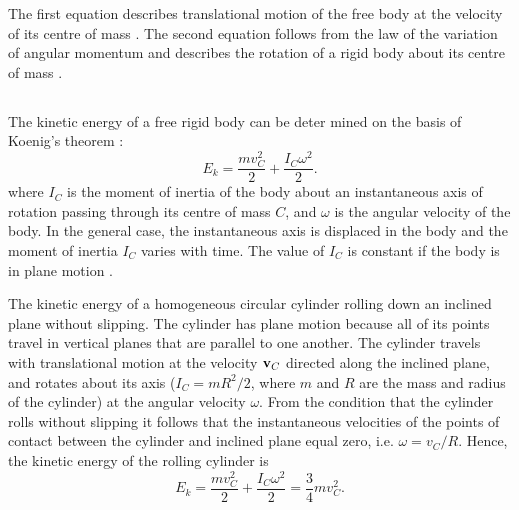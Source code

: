 The first equation describes translational motion of the free body at the velocity of its centre of mass . The second equation follows from the law of the variation of angular momentum  and describes the rotation of a rigid body about its centre of mass .

\subsection{}\label{4.3.7} The kinetic energy of a free rigid body can be deter­ mined on the basis of Koenig's theorem :
\begin{equation*}%
E_{k} = \frac{mv_{C}^{2}}{2} + \frac{I_{C}\omega^{2}}{2}.
\end{equation*}
where $I_{C}$ is the moment of inertia of the body about an instan­taneous axis of rotation passing through its centre of mass $C$, and $\omega$ is the angular velocity of the body. In the general case, the instantaneous axis is displaced in the body and the moment of inertia $I_{C}$ varies with time. The value of $I_{C}$ is constant if the body is in plane motion .

 The kinetic energy of a homogeneous circular cylinder rolling down an inclined plane without slipping. The cylinder has plane motion because all of its points travel in vertical planes that are parallel to one another. The cylinder travels with translational motion at the velocity $\vb{v}_{C}$ directed along the inclined plane, and rotates about its axis ($I_{C} = mR^{2}/2$, where $m$ and $R$ are the mass and radius of the cylinder) at the angular velocity $\omega$. From the condition that the cylinder rolls without slipping it follows that the instantaneous veloci­ties of the points of contact between the cylinder and inclined plane equal zero, i.e. $\omega = v_{C}/R$. Hence, the kinetic energy of the rolling cylinder is
\begin{equation*}%
E_{k} = \frac{mv_{C}^{2}}{2} + \frac{I_{C}\omega^{2}}{2} = \frac{3}{4}mv_{C}^{2}.
\end{equation*}


